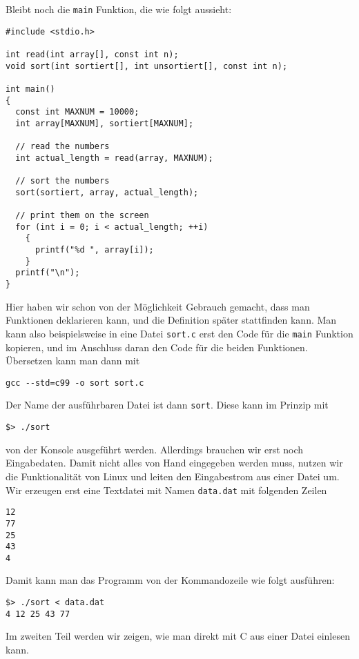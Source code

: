 Bleibt noch die \verb|main| Funktion, die wie folgt aussieht:
\begin{lstlisting}
#include <stdio.h>

int read(int array[], const int n);
void sort(int sortiert[], int unsortiert[], const int n);

int main()
{
  const int MAXNUM = 10000;
  int array[MAXNUM], sortiert[MAXNUM];

  // read the numbers
  int actual_length = read(array, MAXNUM);

  // sort the numbers
  sort(sortiert, array, actual_length);

  // print them on the screen
  for (int i = 0; i < actual_length; ++i)
    {
      printf("%d ", array[i]);
    }
  printf("\n");
}
\end{lstlisting}
Hier haben wir schon von der Möglichkeit Gebrauch gemacht, dass man Funktionen deklarieren kann, und die Definition später stattfinden kann.
Man kann also beispielsweise in eine Datei \verb|sort.c| erst den Code für die \verb|main| Funktion kopieren, und im Anschluss daran den Code für die beiden Funktionen.
Übersetzen kann man dann mit
\begin{verbatim}
gcc --std=c99 -o sort sort.c
\end{verbatim}
Der Name der ausführbaren Datei ist dann \verb|sort|.
Diese kann im Prinzip mit
\begin{verbatim}
$> ./sort
\end{verbatim}
von der Konsole ausgeführt werden.
Allerdings brauchen wir erst noch Eingabedaten.
Damit nicht alles von Hand eingegeben werden muss, nutzen wir die Funktionalität von Linux und leiten den Eingabestrom aus einer Datei um.
Wir erzeugen erst eine Textdatei mit Namen \verb|data.dat| mit folgenden Zeilen
\begin{verbatim}
12
77
25
43
4
\end{verbatim}
Damit kann man das Programm von der Kommandozeile wie folgt ausführen:
\begin{verbatim}
$> ./sort < data.dat
4 12 25 43 77
\end{verbatim}
Im zweiten Teil werden wir zeigen, wie man direkt mit C aus einer Datei einlesen kann.

\endinput
